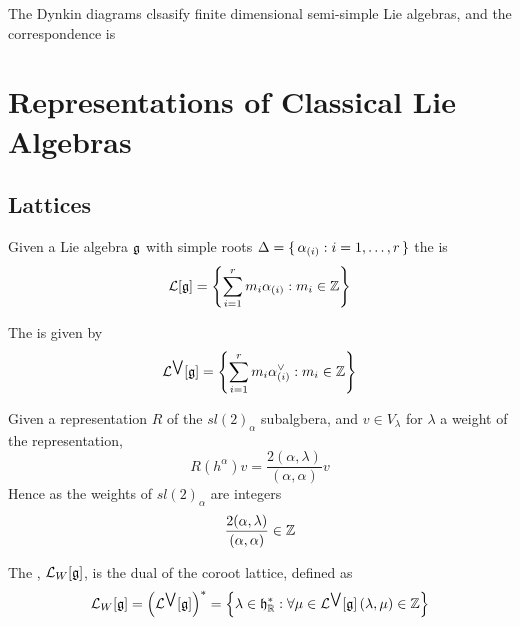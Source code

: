 \documentclass{article}
\begin{document}
\begin{theorem}
	The Dynkin diagrams clsasify finite dimensional semi-simple Lie algebras, and the correspondence is 
\end{theorem}

\section{Representations of Classical Lie Algebras}
\subsection{Lattices}

\begin{definition}
	Given a Lie algebra $\mathfrak{g}$ with simple roots $\Delta=\set{  \alpha_{(i)} : i=1,\dots,r  }$ the  is 
	\[
	\mathcal{L} [\mathfrak{g}] = \left\{ \sum_{i=1}^r m_i \alpha_{(i)} : m_i \in\mathbb{Z} \right\}
	\]
\end{definition}

\begin{definition}
	The  is given by 
	\[
	\mathcal{L}^{\bigvee} [\mathfrak{g}] =\left\{ \sum_{i=1}^r m_i \alpha^\vee_{(i)} : m_i \in\mathbb{Z} \right\}
	\]
\end{definition}

\begin{definition}
	Given a representation $R$ of the $sl(2)_\alpha$ subalgbera, and $v\in V_\lambda$ for $\lambda$ a weight of the representation,
	\[
	R(h^\alpha)v=\frac{2(\alpha,\lambda)}{(\alpha,\alpha)}v
	\]
	Hence as the weights of $sl(2)_\alpha$ are integers
	\[
	\frac{2(\alpha,\lambda)}{(\alpha,\alpha)} \in \mathbb{Z}
	\]
\end{definition}

\begin{definition}
	The , $\mathcal{L}_W [\mathfrak{g}]$, is the dual of the coroot lattice, defined as 
	\[
	\mathcal{L}_W [\mathfrak{g}] = \left( \mathcal{L}^{\bigvee} [\mathfrak{g}] \right)^\ast = \left\{ \lambda\in\mathfrak{h}^\ast_{\mathbb{R}} : \forall \mu\in\mathcal{L}^{\bigvee} [\mathfrak{g}] \, (\lambda, \mu) \in \mathbb{Z} \right\}
	\]
\end{definition}
\end{document}
